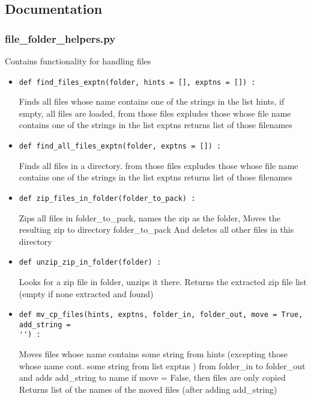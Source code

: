 \documentclass[
12pt,%
a4paper,  %
twoside        %
]{report}
\begin{document}
\begin{landscape}

\chapter{Documentation}
\subsection{file\_folder\_helpers.py}
Contains functionality for handling files
\begin{itemize}
\item \begin{verbatim}
def find_files_exptn(folder, hints = [], exptns = []) :
\end{verbatim}
Finds all files whose name contains one of the strings in the 
list hints, if empty, all files are loaded, from those files expludes those whose file name 
contains one of the strings in the list exptns
returns list of those filenames
\item \begin{verbatim}
def find_all_files_exptn(folder, exptns = []) :
\end{verbatim}
Finds all files in a directory. from those files expludes those whose file name 
contains one of the strings in the list exptns
returns list of those filenames
\item \begin{verbatim}
def zip_files_in_folder(folder_to_pack) :
\end{verbatim}
Zips all files in folder\_to\_pack, names the zip as the folder,
Moves the resulting zip to directory folder\_to\_pack
And deletes all other files in this directory
\item \begin{verbatim}
def unzip_zip_in_folder(folder) :
\end{verbatim}
Looks for a zip file in folder, unzips it there. Returns the extracted zip file list (empty 
if none extracted and found)
\item \begin{verbatim}
def mv_cp_files(hints, exptns, folder_in, folder_out, move = True, add_string =
'') :
\end{verbatim}
Moves files whose name contains some string from hints (excepting those whose name cont.
some string from list exptns ) from folder\_in to folder\_out and 
adds add\_string to name
if move = False, then files are only copied
Returns list of the names of the moved files (after adding add\_string)

\end{itemize}
\end{landscape}
\end{document}
